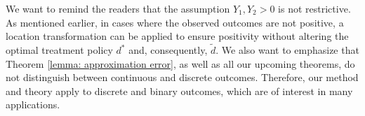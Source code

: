 \documentclass[preprint] {imsart}
\def\blue{\color{black}}
\begin{document}
 {\color{black} \label{page: binary}We want to remind the readers that the assumption $Y_1, Y_2 > 0$ is not restrictive. As mentioned earlier, in cases where the observed outcomes are not positive, a location transformation can be applied to ensure positivity without altering the optimal treatment policy $d^*$ and, consequently, $\tilde{d}$.  We also want to emphasize that  Theorem \ref{lemma: approximation error}, as well as  all our upcoming theorems, do not distinguish between continuous and discrete outcomes. Therefore, our method and theory apply to discrete and binary outcomes, which are of interest in many applications.}
 
\end{document}
